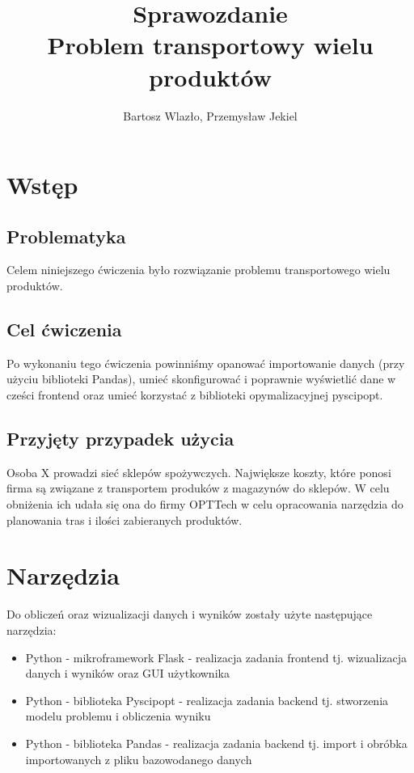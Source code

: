 \documentclass[11pt]{article}
\begin{document}
\title{ \textbf{Sprawozdanie} \protect\\ Problem transportowy wielu produktów}
\author{Bartosz Wlazło, Przemysław Jekiel}
\maketitle
{}

\newpage 


\section{Wstęp}

\subsection{Problematyka}

Celem niniejszego ćwiczenia było rozwiązanie problemu transportowego wielu produktów. 

\subsection{Cel ćwiczenia}

Po wykonaniu tego ćwiczenia powinniśmy opanować importowanie danych (przy użyciu biblioteki Pandas), umieć skonfigurować i poprawnie wyświetlić dane w cześci frontend oraz umieć korzystać z biblioteki opymalizacyjnej pyscipopt. 

\subsection{Przyjęty przypadek użycia}

Osoba X prowadzi sieć sklepów spożywczych. Największe koszty, które ponosi firma są związane z transportem produków z magazynów do sklepów. W celu obniżenia ich udała się ona do firmy OPTTech w celu opracowania narzędzia do planowania tras i ilości zabieranych produktów.

\section{Narzędzia}
Do obliczeń oraz wizualizacji danych i wyników zostały użyte następujące narzędzia:
\begin{itemize}
	\item Python - mikroframework Flask - realizacja zadania frontend tj. wizualizacja danych i wyników oraz GUI użytkownika
	\item Python - biblioteka Pyscipopt - realizacja zadania backend tj. stworzenia modelu problemu i obliczenia wyniku
	\item Python - biblioteka Pandas - realizacja zadania backend tj. import i obróbka importowanych z pliku bazowodanego danych	
\end{itemize}
\end{document}
